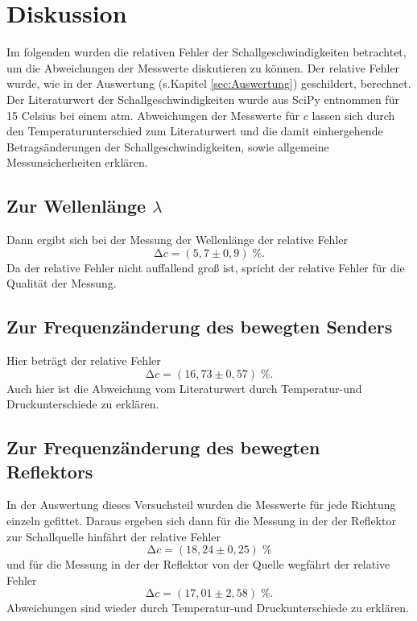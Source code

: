 \section{Diskussion}
\label{sec:Diskussion}
Im folgenden wurden die relativen Fehler der Schallgeschwindigkeiten betrachtet,
um die Abweichungen der Messwerte diskutieren zu können. Der relative Fehler wurde,
wie in der Auswertung (s.Kapitel \ref{sec:Auswertung}) geschildert, berechnet.
Der Literaturwert der
Schallgeschwindigkeiten wurde aus SciPy \cite{scipy} entnommen für 15 Celsius bei
einem atm.
Abweichungen der Messwerte für $c$ lassen sich durch
den Temperaturunterschied zum Literaturwert und die damit einhergehende
Betragsänderungen der Schallgeschwindigkeiten, sowie allgemeine Messunsicherheiten
erklären.
\subsection{Zur Wellenlänge \texorpdfstring{$\lambda$}{[math]}}
Dann ergibt sich bei der Messung der Wellenlänge der relative Fehler
\begin{equation*}
  \increment c = (5,7 \pm 0,9)\;\%.
\end{equation*}
Da der relative Fehler nicht auffallend groß ist, spricht der relative Fehler
für die Qualität der Messung.
\subsection{Zur Frequenzänderung des bewegten Senders}
Hier beträgt der relative Fehler
\begin{equation*}
    \increment c = (16,73 \pm 0,57)\;\%.
\end{equation*}
Auch hier ist die Abweichung vom Literaturwert durch Temperatur-und
Druckunterschiede zu erklären.
\subsection{Zur Frequenzänderung des bewegten Reflektors}
In der Auswertung dieses Versuchsteil wurden die Messwerte für  jede
Richtung einzeln gefittet. Daraus ergeben sich dann für die Messung in der
der Reflektor zur Schallquelle hinfährt der relative Fehler
\begin{equation*}
    \increment c = (18,24 \pm 0,25)\;\%
\end{equation*}
und für die Messung in der der Reflektor von der Quelle wegfährt der relative
Fehler
\begin{equation*}
    \increment c = (17,01 \pm 2,58)\;\%.
\end{equation*}
Abweichungen sind wieder durch Temperatur-und Druckunterschiede zu erklären.
